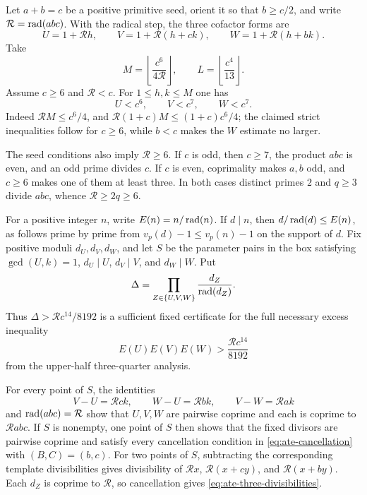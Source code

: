 Let $a+b=c$ be a positive primitive seed, orient it so that $b\ge c/2$, and
write $\mathcal R=\operatorname{rad}(abc)$.  With the radical step, the three cofactor
forms are
\begin{equation}\label{eq:ate-affine-forms}
 U=1+\mathcal Rh,\qquad
 V=1+\mathcal R(h+ck),\qquad
 W=1+\mathcal R(h+bk).
\end{equation}
Take
\begin{equation}\label{eq:ate-M-L}
 M=\left\lfloor\frac{c^6}{4\mathcal R}\right\rfloor,
 \qquad L=\left\lfloor\frac{c^4}{13}\right\rfloor.
\end{equation}
Assume $c\ge6$ and $\mathcal R<c$.  For $1\le h,k\le M$ one has
\begin{equation}\label{eq:ate-size-caps}
 U<c^6,\qquad V<c^7,\qquad W<c^7.
\end{equation}
Indeed $\mathcal RM\le c^6/4$, and
$\mathcal R(1+c)M\le(1+c)c^6/4$; the claimed strict inequalities follow
for $c\ge6$, while $b<c$ makes the $W$ estimate no larger.

The seed conditions also imply $\mathcal R\ge6$.  If $c$ is odd, then
$c\ge7$, the product $abc$ is even, and an odd prime divides $c$.  If $c$
is even, coprimality makes $a,b$ odd, and $c\ge6$ makes one of them at least
three.  In both cases distinct primes $2$ and $q\ge3$ divide $abc$, whence
$\mathcal R\ge2q\ge6$.

For a positive integer $n$, write $E(n)=n/\operatorname{rad}(n)$.  If $d\mid n$, then
$d/\operatorname{rad}(d)\le E(n)$, as follows prime by prime from
$v_p(d)-1\le v_p(n)-1$ on the support of $d$.  Fix positive moduli
$d_U,d_V,d_W$, and let $S$ be the parameter pairs in the box satisfying
$\gcd(U,k)=1$, $d_U\mid U$, $d_V\mid V$, and $d_W\mid W$.  Put
\begin{equation}\label{eq:ate-delta}
 \Delta=\prod_{Z\in\{U,V,W\}}\frac{d_Z}{\operatorname{rad}(d_Z)}.
\end{equation}
Thus $\Delta>\mathcal Rc^{14}/8192$ is a sufficient fixed certificate for
the full necessary excess inequality
\begin{equation}\label{eq:ate-full-excess}
 E(U)E(V)E(W)>\frac{\mathcal Rc^{14}}{8192}
\end{equation}
from the upper-half three-quarter analysis.

For every point of $S$, the identities
\[
 V-U=\mathcal Rck,\qquad W-U=\mathcal Rbk,
 \qquad V-W=\mathcal Rak
\]
and $\operatorname{rad}(abc)=\mathcal R$ show that $U,V,W$ are pairwise coprime and each
is coprime to $\mathcal Rabc$.  If $S$ is nonempty, one point of $S$ then
shows that the fixed divisors are
pairwise coprime and satisfy every cancellation condition in
\eqref{eq:ate-cancellation} with $(B,C)=(b,c)$.
For two points of $S$, subtracting the corresponding template
divisibilities gives divisibility of $\mathcal Rx$,
$\mathcal R(x+cy)$, and $\mathcal R(x+by)$.  Each $d_Z$ is coprime to
$\mathcal R$, so cancellation gives \eqref{eq:ate-three-divisibilities}.

